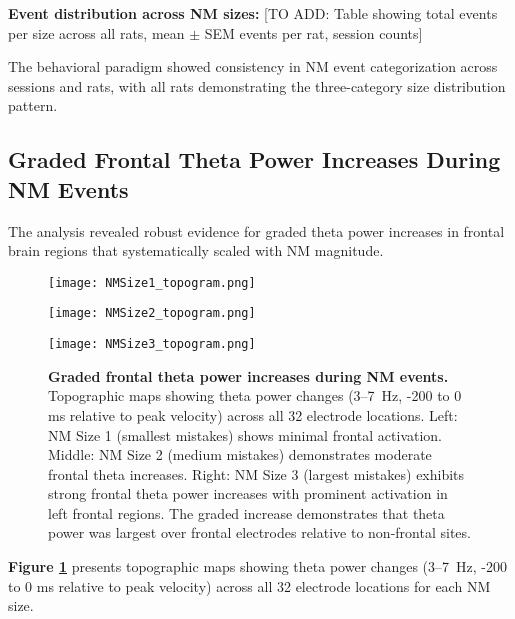 \documentclass[11pt]{article}
\begin{document}
\textbf{Event distribution across NM sizes:} [TO ADD: Table showing total events per size across all rats, mean $\pm$ SEM events per rat, session counts]

The behavioral paradigm showed consistency in NM event categorization across sessions and rats, with all rats demonstrating the three-category size distribution pattern.

\subsection{Graded Frontal Theta Power Increases During NM Events}

The analysis revealed robust evidence for graded theta power increases in frontal brain regions that systematically scaled with NM magnitude.

\begin{figure}[H]
\centering
\begin{minipage}{0.3\textwidth}
\centering
\texttt{[image: NMSize1\_topogram.png]}
\end{minipage}
\hfill
\begin{minipage}{0.3\textwidth}
\centering
\texttt{[image: NMSize2\_topogram.png]}
\end{minipage}
\hfill
\begin{minipage}{0.3\textwidth}
\centering
\texttt{[image: NMSize3\_topogram.png]}
\end{minipage}
\caption{\textbf{Graded frontal theta power increases during NM events.} Topographic maps showing theta power changes (3--7~Hz, -200 to 0 ms relative to peak velocity) across all 32 electrode locations. Left: NM Size 1 (smallest mistakes) shows minimal frontal activation. Middle: NM Size 2 (medium mistakes) demonstrates moderate frontal theta increases. Right: NM Size 3 (largest mistakes) exhibits strong frontal theta power increases with prominent activation in left frontal regions. The graded increase demonstrates that theta power was largest over frontal electrodes relative to non-frontal sites.}
\label{fig:frontal_theta}
\end{figure}

\textbf{Figure \ref{fig:frontal_theta}} presents topographic maps showing theta power changes (3--7~Hz, -200 to 0 ms relative to peak velocity) across all 32 electrode locations for each NM size.
\end{document}
